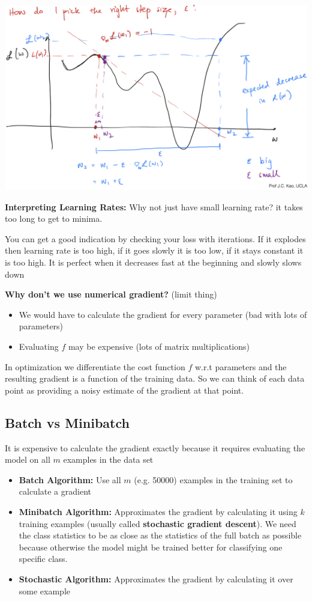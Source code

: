 \documentclass[twocolumn, letter, 10pt, landscape]{article}
\newcommand{\tb}{\textbf}
\newcommand{\bit}{\vspace{-0.1in}\begin{itemize}\setlength\itemsep{-0.05in}}
\newcommand{\eit}{\end{itemize}\vspace{-0.1in}}
\begin{document}
\begin{minipage}{4in}
\includegraphics[scale=0.5]{lec5_graph.png}
\end{minipage}
\begin{minipage}{1.2in}
\tb{Interpreting Learning Rates:} Why not just have small learning rate? it takes too long to get to minima. 

You can get a good indication by checking your loss with iterations. If it explodes then learning rate is too high, if it goes slowly it is too low, if it stays constant it is too high. It is perfect when it decreases fast at the beginning and slowly slows down
\end{minipage}

\tb{Why don't we use numerical gradient?} (limit thing)

\bit{}
\item We would have to calculate the gradient for every parameter (bad with lots of parameters)
\item Evaluating $f$ may be expensive (lots of matrix multiplications)
\eit{}

In optimization we differentiate the cost function $f$ w.r.t parameters and the resulting gradient is a function of the training data. So we can think of each data point as providing a noisy estimate of the gradient at that point.

\subsection{Batch vs Minibatch}
It is expensive to calculate the gradient exactly because it requires evaluating the model on all $m$ examples in the data set
\bit{}
\item \tb{Batch Algorithm:} Use all $m$ (e.g. 50000) examples in the training set to calculate a gradient
\item \tb{Minibatch Algorithm:} Approximates the gradient by calculating it using $k$ training examples (usually called \tb{stochastic gradient descent}). We need the class statistics to be as close as the statistics of the full batch as possible because otherwise the model might be trained better for classifying one specific class.
\item \tb{Stochastic Algorithm:} Approximates the gradient by calculating it over some example
\eit{}
\end{document}
